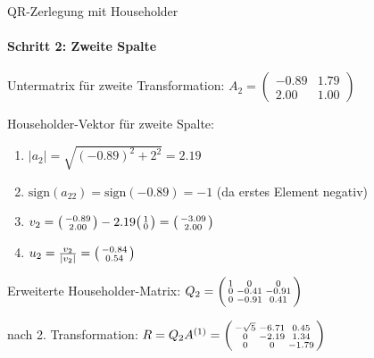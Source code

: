\begin{example2}[breakable]{QR-Zerlegung mit Householder}
\paragraph{Schritt 2: Zweite Spalte}
Untermatrix für zweite Transformation:
$A_2 = \begin{pmatrix} -0.89 & 1.79\\ 2.00 & 1.00 \end{pmatrix}$

Householder-Vektor für zweite Spalte:
\vspace{1mm}
\begin{enumerate}
    \item $|a_2| = \sqrt{(-0.89)^2 + 2^2} = 2.19$
    \vspace{1mm}
    \item $\text{sign}(a_{22}) = \text{sign}(-0.89) = -1$ (da erstes Element negativ)
    \vspace{1mm}
    \item $v_2 = \begin{psmallmatrix} -0.89\\ 2.00 \end{psmallmatrix} - 2.19\begin{psmallmatrix} 1\\ 0 \end{psmallmatrix} = \begin{psmallmatrix} -3.09\\ 2.00 \end{psmallmatrix}$
    \vspace{1mm}
    \item $u_2 = \frac{v_2}{|v_2|} = \begin{psmallmatrix} -0.84\\ 0.54 \end{psmallmatrix}$
\end{enumerate}
\vspace{1mm}
Erweiterte Householder-Matrix: %
$Q_2 = \begin{psmallmatrix}
1 & 0 & 0\\
0 & -0.41 & -0.91\\
0 & -0.91 & 0.41
\end{psmallmatrix}$

nach 2. Transformation:
$R = Q_2A^{(1)} = \begin{psmallmatrix}
-\sqrt{5} & -6.71 & 0.45\\
0 & -2.19 & 1.34\\
0 & 0 & -1.79
\end{psmallmatrix}$


\end{example2}
